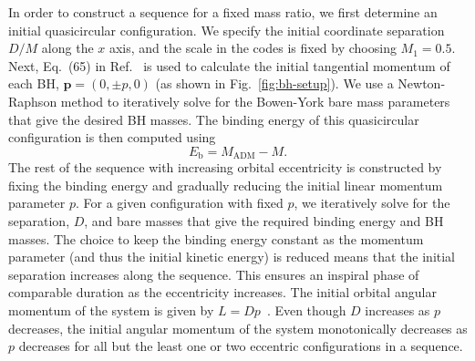 \documentclass[floats,floatfix,showpacs,amssymb,prd,twocolumn,superscriptaddress,nofootinbib,nolongbibliography,reprint]{revtex4-2}
\begin{document}
In order to construct a sequence for a fixed mass ratio, we first 
determine an initial quasicircular configuration. We specify the initial
coordinate separation $D/M$ along the $x$ axis, and the scale in the codes 
is fixed by choosing $M_1=0.5$. Next, Eq.~(65) in 
Ref.~\cite{Brugmann:2008zz} is used to calculate the initial tangential 
momentum of each BH, $\mathbf{p}=(0,\pm p,0)$ (as shown in 
Fig.~\ref{fig:bh-setup}). We use a 
Newton-Raphson method to iteratively solve for the Bowen-York bare mass 
parameters that give the desired BH masses. The binding energy 
of this quasicircular configuration is then computed using
\begin{equation}
    E_{\mathrm{b}}=M_{\mathrm{ADM}}-M.\label{eq:binding-energy}
\end{equation}
The rest of the sequence with increasing orbital eccentricity is 
constructed by fixing the binding energy and gradually reducing the initial
linear momentum parameter $p$. For a given configuration with fixed $p$, we 
iteratively solve for the separation, $D$, and bare masses that give the 
required binding energy and BH masses. The choice to keep the 
binding energy constant as the momentum parameter (and thus the initial 
kinetic energy) is reduced means that the initial separation increases along 
the sequence. This ensures an inspiral phase of comparable duration as the 
eccentricity increases. The initial orbital angular momentum of the system 
is given by $L=Dp$~\cite{York:1989jn}. Even though $D$ increases as $p$ 
decreases, the initial angular momentum of the system monotonically decreases 
as $p$ decreases for all but the least one or two eccentric configurations 
in a sequence.
\end{document}
